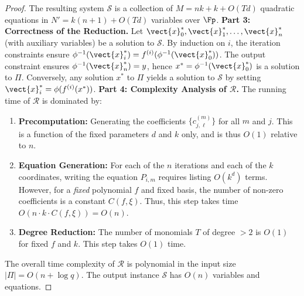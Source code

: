 \begin{proof}
                    The resulting system $\mathcal{S}$ is a collection of $M = nk + k + O(Td)$ quadratic equations in $N' = k(n+1) + O(Td)$ variables over $\Fp$.
                \textbf{Part 3: Correctness of the Reduction.}
                    Let $\vect{x}_0^*, \vect{x}_1^*, \ldots, \vect{x}_n^*$ (with auxiliary variables) be a solution to $\mathcal{S}$. By induction on $i$, the iteration constraints ensure $\phi^{-1}(\vect{x}_i^*) = f^{(i)}(\phi^{-1}(\vect{x}_0^*))$. The output constraint ensures $\phi^{-1}(\vect{x}_n^*) = y$, hence $x^* = \phi^{-1}(\vect{x}_0^*)$ is a solution to $\Pi$. Conversely, any solution $x^*$ to $\Pi$ yields a solution to $\mathcal{S}$ by setting $\vect{x}_i^* = \phi(f^{(i)}(x^*))$.
                \textbf{Part 4: Complexity Analysis of $\mathcal{R}$.}
                    The running time of $\mathcal{R}$ is dominated by:
                    \begin{enumerate}
                        \item \textbf{Precomputation:} Generating the coefficients $\{c_{j, \boldsymbol{\ell}}^{(m)}\}$ for all $m$ and $j$. This is a function of the fixed parameters $d$ and $k$ only, and is thus $O(1)$ relative to $n$.
                        \item \textbf{Equation Generation:} For each of the $n$ iterations and each of the $k$ coordinates, writing the equation $P_{i,m}$ requires listing $O(k^d)$ terms. However, for a \textit{fixed} polynomial $f$ and fixed basis, the number of non-zero coefficients is a constant $C(f, \xi)$. Thus, this step takes time $O(n \cdot k \cdot C(f, \xi)) = O(n)$.
                        \item \textbf{Degree Reduction:} The number of monomials $T$ of degree $>2$ is $O(1)$ for fixed $f$ and $k$. This step takes $O(1)$ time.
                    \end{enumerate}
                    The overall time complexity of $\mathcal{R}$ is polynomial in the input size $|\Pi| = O(n + \log q)$. The output instance $\mathcal{S}$ has $O(n)$ variables and equations.
            \end{proof}
